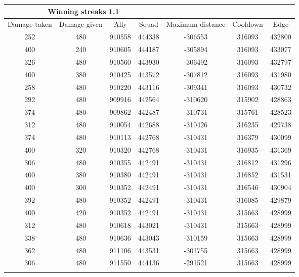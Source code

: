 \begin{centering}
 \begin{tabular}{|c||c|c|c|c|c|c|}
	\multicolumn{4}{c}{Winning streaks 1.1} \\
	\hline
		Damage taken & Damage given & Ally & Squad & Maximum distance & Cooldown & Edge \\
	\hline
	
	252&	480&	910558&	444338&	-306553&	316093&	432800\\
	400&	240&	910605&	444187&	-305894&	316093&	433077\\
	326&	480&	910560&	443930&	-306492&	316093&	432797\\
	400&	380&	910425&	443572&	-307812&	316093&	431980\\
	258&	480&	910220&	443116&	-309341&	316093&	430732\\
	292&	480&	909916&	442564&	-310620&	315902&	428863\\
	374&	480&	909862&	442487&	-310731&	315761&	428523\\
	312&	480&	910054&	442688&	-310426&	316235&	429738\\
	374&	480&	910113&	442768&	-310431&	316379&	430099\\
	400&	320&	910320&	442768&	-310431&	316935&	431369\\
	306&	480&	910355&	442491&	-310431&	316812&	431296\\
	400&	380&	910380&	442491&	-310431&	316852&	431531\\
	400&	300&	910352&	442491&	-310431&	316546&	430904\\
	392&	480&	910352&	442491&	-310431&	316085&	429879\\
	400&	420&	910352&	442491&	-310431&	315663&	428999\\
	312&	480&	910618&	443021&	-310431&	315663&	428999\\
	338&	480&	910636&	443043&	-310159&	315663&	428999\\
	362&	480&	911106&	443531&	-301755&	315663&	428999\\
	306&	480&	911550&	444136&	-291521&	315663&	428999\\
	
	
	
	
	\hline
\label{test1.1}
\end{tabular}
\end{centering}





